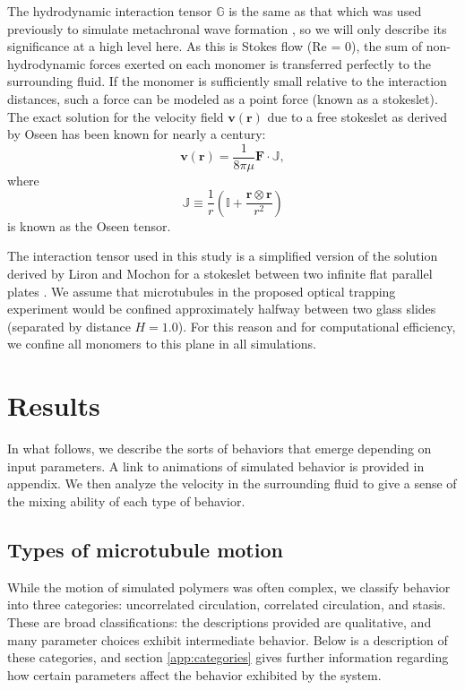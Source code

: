 \documentclass[11pt]{ucthesis}
\begin{document}
The hydrodynamic interaction tensor $\mathbb{G}$ is the same as that which was used previously to simulate metachronal wave formation \cite{martin2018emergence}, so we will only describe its significance at a high level here. As this is Stokes flow (Re = 0), the sum of non-hydrodynamic forces exerted on each monomer is transferred perfectly to the surrounding fluid. If the monomer is sufficiently small relative to the interaction distances, such a force can be modeled as a point force (known as a stokeslet). The exact solution for the velocity field $\mathbf{v}(\mathbf{r})$ due to a free stokeslet as derived by Oseen has been known for nearly a century:
\begin{equation}
\label{eq:oseen}
\mathbf{v}(\mathbf{r}) = \frac{1}{8\pi\mu}\mathbf{F}\cdot \mathbb{J},
\end{equation} 
where
\begin{equation}
\label{eq:oseentensor}
\mathbb{J} \equiv \frac1r \left(\mathbb I + \frac{\mathbf{r}\otimes\mathbf{r}}{r^2}\right)
\end{equation}
is known as the Oseen tensor. 

The interaction tensor used in this study is a simplified version of the solution derived by Liron and Mochon for a stokeslet between two infinite flat parallel plates \cite{Liron1976,martin2018emergence}. We assume that microtubules in the proposed optical trapping experiment would be confined approximately halfway between two glass slides (separated by distance $H=1.0$). For this reason and for computational efficiency, we confine all monomers to this plane in all simulations.

\section{Results}
\label{sec:results}

In what follows, we describe the sorts of behaviors that emerge depending on input parameters. A link to animations of simulated behavior is provided in appendix. We then analyze the velocity in the surrounding fluid to give a sense of the mixing ability of each type of behavior.

\subsection{Types of microtubule motion}

While the motion of simulated polymers was often complex, we classify behavior into three categories: uncorrelated circulation, correlated circulation, and stasis. These are broad classifications: the descriptions provided are qualitative, and many parameter choices exhibit intermediate behavior. Below is a description of these categories, and section \ref{app:categories} gives further information regarding how certain parameters affect the behavior exhibited by the system.
\end{document}
